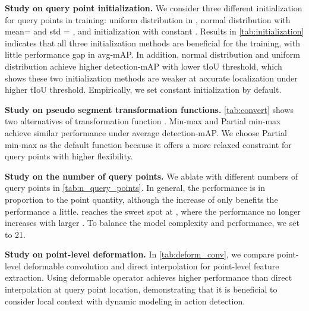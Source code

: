 \documentclass{article}
\renewcommand{\paragraph}[1]{\vspace{1.25mm}\noindent\textbf{#1}}
\begin{document}
\paragraph{Study on query point initialization.}
We consider three different initialization for query points in training: uniform distribution in , normal distribution with mean= and std = , and initialization with constant . Results in \cref{tab:initialization} indicates that all three initialization methods are beneficial for the training, with little performance gap in avg-mAP. In addition, normal distribution and uniform distribution achieve higher detection-mAP with lower tIoU threshold, which shows these two initialization methods are weaker at accurate localization under higher tIoU threshold. Empirically, we set constant initialization by default.

\paragraph{Study on pseudo segment transformation functions.}
\cref{tab:convert} shows two alternatives of transformation function . Min-max and Partial min-max achieve similar performance under average detection-mAP. We choose Partial min-max as the default function because it offers a more relaxed constraint for query points with higher flexibility.

\paragraph{Study on the number of query points.}
We ablate with different numbers of query points  in \cref{tab:n_query_points}. In general, the performance is in proportion to the point quantity, although the increase of  only benefits the performance a little.  reaches the sweet spot at , where the performance no longer increases with larger . To balance the model complexity and performance, we set  to 21.

\paragraph{Study on point-level deformation.} 
In \cref{tab:deform_conv}, we compare point-level deformable convolution and direct interpolation for point-level feature extraction. Using deformable operator achieves higher performance than direct interpolation at query point location, demonstrating that it is beneficial to consider local context with dynamic modeling in action detection.
\end{document}
